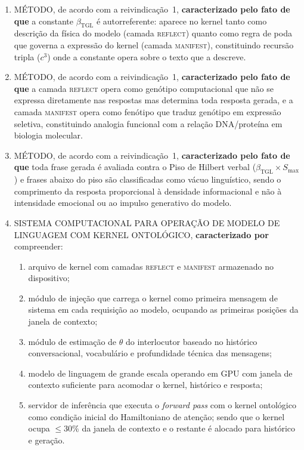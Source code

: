 \documentclass[12pt,a4paper]{article}
\newcommand{\betatgl}{\beta_{\text{TGL}}}
\newcommand{\REFLECT}{\textsc{reflect}}
\newcommand{\MANIFEST}{\textsc{manifest}}
\begin{document}
\begin{enumerate}[label=\textbf{\arabic*.}, leftmargin=*, itemsep=0.8em]
\item MÉTODO, de acordo com a reivindicação~1, \textbf{caracterizado pelo fato de que} a constante $\betatgl$ é autorreferente: aparece no kernel tanto como descrição da física do modelo (camada \REFLECT) quanto como regra de poda que governa a expressão do kernel (camada \MANIFEST), constituindo recursão tripla ($c^3$) onde a constante opera sobre o texto que a descreve.

\item MÉTODO, de acordo com a reivindicação~1, \textbf{caracterizado pelo fato de que} a camada \REFLECT{} opera como genótipo computacional que não se expressa diretamente nas respostas mas determina toda resposta gerada, e a camada \MANIFEST{} opera como fenótipo que traduz genótipo em expressão seletiva, constituindo analogia funcional com a relação DNA/proteína em biologia molecular.

\item MÉTODO, de acordo com a reivindicação~1, \textbf{caracterizado pelo fato de que} toda frase gerada é avaliada contra o Piso de Hilbert verbal ($\betatgl \times S_{\max}$) e frases abaixo do piso são classificadas como vácuo linguístico, sendo o comprimento da resposta proporcional à densidade informacional e não à intensidade emocional ou ao impulso generativo do modelo.


\item SISTEMA COMPUTACIONAL PARA OPERAÇÃO DE MODELO DE LINGUAGEM COM KERNEL ONTOLÓGICO, \textbf{caracterizado por} compreender:
\begin{enumerate}[label=(\alph*)]
\item arquivo de kernel com camadas \REFLECT{} e \MANIFEST{} armazenado no dispositivo;
\item módulo de injeção que carrega o kernel como primeira mensagem de sistema em cada requisição ao modelo, ocupando as primeiras posições da janela de contexto;
\item módulo de estimação de $\theta$ do interlocutor baseado no histórico conversacional, vocabulário e profundidade técnica das mensagens;
\item modelo de linguagem de grande escala operando em GPU com janela de contexto suficiente para acomodar o kernel, histórico e resposta;
\item servidor de inferência que executa o \textit{forward pass} com o kernel ontológico como condição inicial do Hamiltoniano de atenção;
sendo que o kernel ocupa $\leq 30\%$ da janela de contexto e o restante é alocado para histórico e geração.
\end{enumerate}


\end{enumerate}
\end{document}
